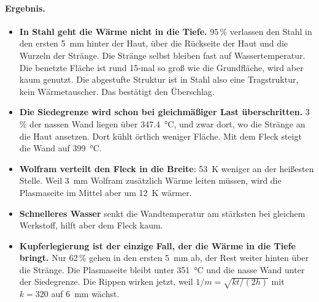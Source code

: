 \documentclass[10pt,a4paper]{article}
\begin{document}
\paragraph{Ergebnis.}
\begin{itemize}
\item \textbf{In Stahl geht die Wärme nicht in die Tiefe.} 95\,\% verlassen den Stahl in den ersten \SI{5}{mm} hinter der Haut, über die Rückseite der Haut und die Wurzeln der Stränge. Die Stränge selbst bleiben fast auf Wassertemperatur. Die benetzte Fläche ist rund 15-mal so groß wie die Grundfläche, wird aber kaum genutzt. Die abgestufte Struktur ist in Stahl also eine Tragstruktur, kein Wärmetauscher. Das bestätigt den Überschlag.
\item \textbf{Die Siedegrenze wird schon bei gleichmäßiger Last überschritten.} 3\,\% der nassen Wand liegen über \SI{347,4}{\celsius}, und zwar dort, wo die Stränge an die Haut ansetzen. Dort kühlt örtlich weniger Fläche. Mit dem Fleck steigt die Wand auf \SI{399}{\celsius}.
\item \textbf{Wolfram verteilt den Fleck in die Breite}: \SI{53}{K} weniger an der heißesten Stelle. Weil \SI{3}{mm} Wolfram zusätzlich Wärme leiten müssen, wird die Plasmaseite im Mittel aber um \SI{12}{K} wärmer.
\item \textbf{Schnelleres Wasser} senkt die Wandtemperatur am stärksten bei gleichem Werkstoff, hilft aber dem Fleck kaum.
\item \textbf{Kupferlegierung ist der einzige Fall, der die Wärme in die Tiefe bringt.} Nur 62\,\% gehen in den ersten \SI{5}{mm} ab, der Rest weiter hinten über die Stränge. Die Plasmaseite bleibt unter \SI{351}{\celsius} und die nasse Wand unter der Siedegrenze. Die Rippen wirken jetzt, weil $1/m=\sqrt{k t/(2h)}$ mit $k=320$ auf \SI{6}{mm} wächst.
\end{itemize}
\end{document}
